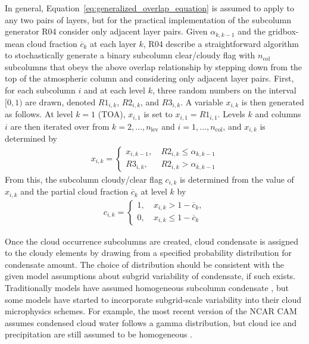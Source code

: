 In general, Equation~\ref{eq:generalized_overlap_equation} is assumed to
apply to any two pairs of layers, but for the practical implementation
of the subcolumn generator R04 consider only adjacent layer pairs. Given
\(\alpha_{k, k-1}\) and the gridbox-mean cloud fraction
\(\overline{c}_{k}\) at each layer \(k\), R04 describe a straightforward
algorithm to stochastically generate a binary subcolumn clear/cloudy
flag with \(n_\textrm{col}\) subcolumns that obeys the above overlap
relationship by stepping down from the top of the atmospheric column and
considering only adjacent layer pairs. First, for each subcolumn \(i\)
and at each level \(k\), three random numbers on the interval \([0, 1)\)
are drawn, denoted \(R1_{i, k}\), \(R2_{i, k}\), and \(R3_{i, k}\). A
variable \(x_{i, k}\) is then generated as follows. At level \(k = 1\)
(TOA), \(x_{i, 1}\) is set to \(x_{i, 1} = R1_{i, 1}\). Levels \(k\) and
columns \(i\) are then iterated over from
\(k = 2, \ldots, n_\textrm{lev}\) and \(i = 1, \ldots, n_\textrm{col}\),
and \(x_{i, k}\) is determined by \[\begin{gathered} 
    x_{i, k} = \begin{cases} 
        x_{i, k-1}, ~ & R2_{i, k} \le \alpha_{k, k-1} \\ 
        R3_{i, k}, ~ & R2_{i, k} > \alpha_{k, k-1}
    \end{cases}
\end{gathered}\] From this, the subcolumn cloudy/clear flag \(c_{i,k}\)
is determined from the value of \(x_{i, k}\) and the partial cloud
fraction \(\overline{c}_{k}\) at level \(k\) by \[\begin{gathered} 
    c_{i, k} = \begin{cases} 
        1, ~ & x_{i, k} > 1 - \overline{c}_{k}, \\ 
        0, ~ & x_{i, k} \le 1 - \overline{c}_{k} 
    \end{cases}
\end{gathered}\]

Once the cloud occurrence subcolumns are created, cloud condensate is
assigned to the cloudy elements by drawing from a specified probability
distribution for condensate amount. The choice of distribution should be
consistent with the given model assumptions about subgrid variability of
condensate, if such exists. Traditionally models have assumed
homogeneous subcolumn condensate \citep[e.g.,
CAM4;][]{neale_et_al_2010a}, but some models have started to incorporate
subgrid-scale variability into their cloud microphysics schemes. For
example, the most recent version of the NCAR CAM assumes condensed cloud
water follows a gamma distribution, but cloud ice and precipitation are
still assumed to be homogeneous \citep[CAM5;][]{neale_et_al_2010b}.

